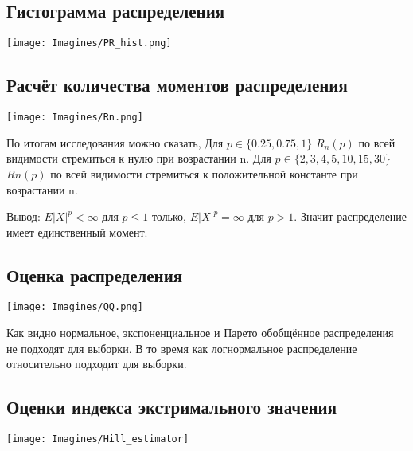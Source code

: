 \documentclass[a4paper,12pt]{article}
\begin{document}
\subsection{Гистограмма распределения}

\begin{center}
\centering 
\texttt{[image: Imagines/PR\_hist.png]}
\end{center}


\subsection{Расчёт количества моментов распределения}

\begin{center}
\centering 
\texttt{[image: Imagines/Rn.png]}
\end{center}

По итогам исследования можно сказать, 
Для $p \in \lbrace 0.25, 0.75, 1 \rbrace $ $R_{n}(p)$ по всей видимости стремиться к нулю при возрастании n.
Для $p \in \lbrace 2, 3, 4, 5, 10, 15, 30 \rbrace $ $ Rn(p)$ по всей видимости стремиться к положительной константе при возрастании n.

Вывод: $E|X|^{p} < \infty$ для $p \leqslant 1$ только, $E|X|^{p} = \infty$ для $p > 1$.  Значит распределение имеет единственный момент.


\subsection{Оценка распределения}

\begin{center}
\centering 
\texttt{[image: Imagines/QQ.png]}
\end{center}
Как видно нормальное, экспоненциальное и Парето обобщённое распределения не подходят для выборки. В то время как логнормальное распределение относительно подходит для выборки.




\subsection{Оценки индекса экстримального значения}
\begin{center}
\centering 
\texttt{[image: Imagines/Hill\_estimator]}
\end{center}
\end{document}
